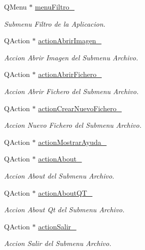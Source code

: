 \begin{DoxyCompactItemize}
Q\+Menu $\ast$ \hyperlink{classCAplicacion_af9dedeec60356a055cb899e5f8a447b8}{menu\+Filtro\+\_\+}
\begin{DoxyCompactList}\small\item\em Submenu Filtro de la Aplicacion. \end{DoxyCompactList}\item 
Q\+Action $\ast$ \hyperlink{classCAplicacion_ac7f0a3871355c19d02bf87f36322cee7}{action\+Abrir\+Imagen\+\_\+}
\begin{DoxyCompactList}\small\item\em Accion Abrir Imagen del Submenu Archivo. \end{DoxyCompactList}\item 
Q\+Action $\ast$ \hyperlink{classCAplicacion_a4fa499b5119ad7bcc86f53ace963cbbd}{action\+Abrir\+Fichero\+\_\+}
\begin{DoxyCompactList}\small\item\em Accion Abrir Fichero del Submenu Archivo. \end{DoxyCompactList}\item 
Q\+Action $\ast$ \hyperlink{classCAplicacion_a1ccc6631cd5cc2efa064edb56c8d0599}{action\+Crear\+Nuevo\+Fichero\+\_\+}
\begin{DoxyCompactList}\small\item\em Accion Nuevo Fichero del Submenu Archivo. \end{DoxyCompactList}\item 
Q\+Action $\ast$ \hyperlink{classCAplicacion_a63715243d5b051de62fa1e895ba861cf}{action\+Mostrar\+Ayuda\+\_\+}
\item 
Q\+Action $\ast$ \hyperlink{classCAplicacion_ac42dda1caacc0506c7015c79fde8416f}{action\+About\+\_\+}
\begin{DoxyCompactList}\small\item\em Accion About del Submenu Archivo. \end{DoxyCompactList}\item 
Q\+Action $\ast$ \hyperlink{classCAplicacion_af0ed23ead2d1c3aea79b724c3cb70249}{action\+About\+Q\+T\+\_\+}
\begin{DoxyCompactList}\small\item\em Accion About Qt del Submenu Archivo. \end{DoxyCompactList}\item 
Q\+Action $\ast$ \hyperlink{classCAplicacion_ac878000751c05f9491a9de6671e6cde0}{action\+Salir\+\_\+}
\begin{DoxyCompactList}\small\item\em Accion Salir del Submenu Archivo. \end{DoxyCompactList}\item 

\end{DoxyCompactItemize}
